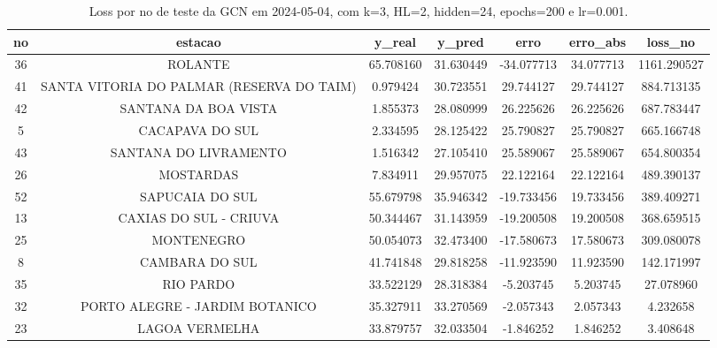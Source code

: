 \begin{table}[h]
\centering
\caption{Loss por no de teste da GCN em 2024-05-04, com k=3, HL=2, hidden=24, epochs=200 e lr=0.001.}
\label{tab:gcn_loss_k3_hl2_h24_e200_d20240504}
\begin{tabular}{ccccccc}
\toprule
no & estacao & y\_real & y\_pred & erro & erro\_abs & loss\_no \\
\midrule
36 & ROLANTE & 65.708160 & 31.630449 & -34.077713 & 34.077713 & 1161.290527 \\
41 & SANTA VITORIA DO PALMAR (RESERVA DO TAIM) & 0.979424 & 30.723551 & 29.744127 & 29.744127 & 884.713135 \\
42 & SANTANA DA BOA VISTA & 1.855373 & 28.080999 & 26.225626 & 26.225626 & 687.783447 \\
5 & CACAPAVA DO SUL & 2.334595 & 28.125422 & 25.790827 & 25.790827 & 665.166748 \\
43 & SANTANA DO LIVRAMENTO & 1.516342 & 27.105410 & 25.589067 & 25.589067 & 654.800354 \\
26 & MOSTARDAS & 7.834911 & 29.957075 & 22.122164 & 22.122164 & 489.390137 \\
52 & SAPUCAIA DO SUL & 55.679798 & 35.946342 & -19.733456 & 19.733456 & 389.409271 \\
13 & CAXIAS DO SUL - CRIUVA & 50.344467 & 31.143959 & -19.200508 & 19.200508 & 368.659515 \\
25 & MONTENEGRO & 50.054073 & 32.473400 & -17.580673 & 17.580673 & 309.080078 \\
8 & CAMBARA DO SUL & 41.741848 & 29.818258 & -11.923590 & 11.923590 & 142.171997 \\
35 & RIO PARDO & 33.522129 & 28.318384 & -5.203745 & 5.203745 & 27.078960 \\
32 & PORTO ALEGRE - JARDIM BOTANICO & 35.327911 & 33.270569 & -2.057343 & 2.057343 & 4.232658 \\
23 & LAGOA VERMELHA & 33.879757 & 32.033504 & -1.846252 & 1.846252 & 3.408648 \\
\bottomrule
\end{tabular}
\end{table}

